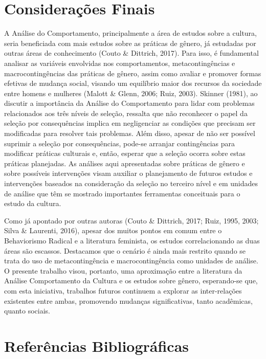 \section*{Considerações Finais}

A Análise do Comportamento, principalmente a área de estudos sobre a cultura, seria beneficiada com mais estudos sobre as práticas de gênero, já estudadas por outras áreas de conhecimento (Couto \& Dittrich, 2017). Para isso, é fundamental analisar as variáveis envolvidas nos comportamentos, metacontingências e macrocontingências das práticas de gênero, assim como avaliar e promover formas efetivas de mudança social, visando um equilíbrio maior dos recursos da sociedade entre homens e mulheres (Malott \& Glenn, 2006; Ruiz, 2003). Skinner (1981), ao discutir a importância da Análise do Comportamento para lidar com problemas relacionados aos três níveis de seleção, ressalta que não reconhecer o papel da seleção por consequências implica em negligenciar as condições que precisam ser modificadas para resolver tais problemas. Além disso, apesar de não ser possível suprimir a seleção por consequências, pode-se arranjar contingências para modificar práticas culturais e, então, esperar que a seleção ocorra sobre estas práticas planejadas. As análises aqui apresentadas sobre práticas de gênero e sobre possíveis intervenções visam auxiliar o planejamento de futuros estudos e intervenções baseados na consideração da seleção no terceiro nível e em unidades de análise que têm se mostrado importantes ferramentas conceituais para o estudo da cultura.

Como já apontado por outras autoras (Couto \& Dittrich, 2017; Ruiz, 1995, 2003; Silva \& Laurenti, 2016), apesar dos muitos pontos em comum entre o Behaviorismo Radical e a literatura feminista, os estudos correlacionando as duas áreas são escassos. Destacamos que o cenário é ainda mais restrito quando se trata do uso de metacontingência e macrocontingência como unidades de análise. O presente trabalho visou, portanto, uma aproximação entre a literatura da Análise Comportamento da Cultura e os estudos sobre gênero, esperando-se que, com esta iniciativa, trabalhos futuros continuem a explorar as inter-relações existentes entre ambas, promovendo mudanças significativas, tanto acadêmicas, quanto sociais.

\section*{Referências Bibliográficas}

